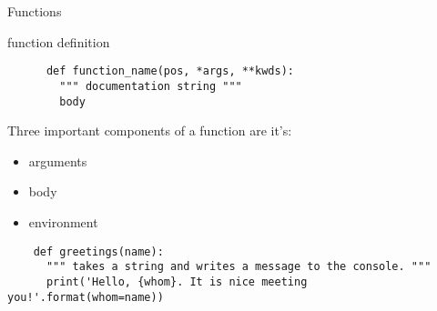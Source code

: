 \begin{frame}[fragile]{Functions}
  \vspace{0.1em}
  \begin{block}{function definition}
    \begin{verbatim}
      def function_name(pos, *args, **kwds):
        """ documentation string """
        body
    \end{verbatim}
  \end{block}

  Three important components of a function are it's:
  \begin{itemize}\vspace{0.1em}
  \item arguments
  \item body
  \item environment
  \end{itemize}
  
  \begin{verbatim}
    def greetings(name):
      """ takes a string and writes a message to the console. """
      print('Hello, {whom}. It is nice meeting you!'.format(whom=name))		
  \end{verbatim}
\end{frame}
